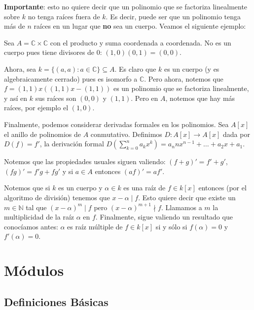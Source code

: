 \documentclass[12pt]{book}
\theoremstyle{definition}
\newcommand{\CC}{\mathbb{C}}
\newcommand{\NN}{\mathbb{N}}
\begin{document}
\textbf{Importante}: esto no quiere decir que un polinomio que se factoriza linealmente sobre $k$ no tenga raíces fuera de $k$. Es decir, puede ser que un polinomio tenga más de $n$ raíces en un lugar que \textbf{no} sea un cuerpo. Veamos el siguiente ejemplo:

Sea $A=\CC\times \CC$ con el producto y suma coordenada a coordenada. No es un cuerpo pues tiene divisores de $0$: $(1,0)(0,1)=(0,0)$.

Ahora, sea $k=\{(a,a):a\in \CC\}\subseteq A$. Es claro que $k$ es un cuerpo (y es algebraicamente cerrado) pues es isomorfo a $\CC$. Pero ahora, notemos que $f = (1,1)x ((1,1)x-(1,1))$ es un polinomio que se factoriza linealmente, y así en $k$ sus raíces son $(0,0)$ y $(1,1)$. Pero en $A$, notemos que hay más raíces, por ejemplo el $(1,0)$.

Finalmente, podemos considerar derivadas formales en los polinomios. Sea $A[x]$ el anillo de polinomios de $A$ conmutativo. Definimos $D:A[x]\to A[x]$ dada por $D(f)=f'$, la derivación formal $D\left(\displaystyle\sum_{k=0}^n a_k x^k \right) = a_n n x^{n-1} + \ldots + a_2 x + a_1$.

Notemos que las propiedades usuales siguen valiendo: $(f+g)'=f'+g'$, $(fg)'=f'g+fg'$ y si $a\in A$ entonces $(af)'=af'$.

Notemos que si $k$ es un cuerpo y $\alpha\in k$ es una raíz de $f\in k[x]$ entonces (por el algoritmo de división) tenemos que $x-\alpha\mid f$. Esto quiere decir que existe un $m\in\NN$ tal que $(x-\alpha)^m \mid f$ pero $(x-\alpha)^{m+1}\nmid f$. Llamamos a $m$ la multiplicidad de la raíz $\alpha$ en $f$. Finalmente, sigue valiendo un resultado que conocíamos antes: $\alpha$ es raíz múltiple de $f\in k[x]$ si y sólo si $f(\alpha)=0$ y $f'(\alpha)=0$.

\chapter{Módulos}

\section{Definiciones Básicas}
\end{document}
